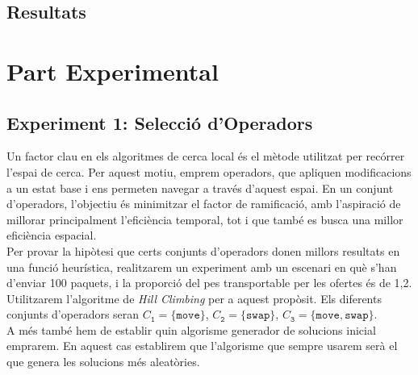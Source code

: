 \documentclass[a4paper]{article}
\begin{document}
	\subsection{Resultats}
	
	\newpage
	\section{Part Experimental}
	
	\subsection{Experiment 1: Selecció d'Operadors}
	
	Un factor clau en els algoritmes de cerca local és el mètode utilitzat per recórrer l'espai de cerca. Per aquest motiu, emprem operadors, que apliquen modificacions a un estat base i ens permeten navegar a través d'aquest espai. En un conjunt d'operadors, l'objectiu és minimitzar el factor de ramificació, amb l'aspiració de millorar principalment l'eficiència temporal, tot i que també es busca una millor eficiència espacial. \\
	
	Per provar la hipòtesi que certs conjunts d'operadors donen millors resultats en una funció heurística, realitzarem un experiment amb un escenari en què s'han d'enviar 100 paquets, i la proporció del pes transportable per les ofertes és de 1,2. Utilitzarem l'algoritme de \textit{Hill Climbing} per a aquest propòsit. Els diferents conjunts d'operadors seran $C_{\texttt{1}} = \{\texttt{move}\}$, $C_{\texttt{2}} = \{\texttt{swap}\}$, $C_{\texttt{3}} = \{\texttt{move}, \texttt{swap}\}$. \\
	
	A més també hem de establir quin algorisme generador de solucions inicial emprarem. En aquest cas establirem que l'algorisme que sempre usarem serà el que genera les solucions més aleatòries.
	
\end{document}
